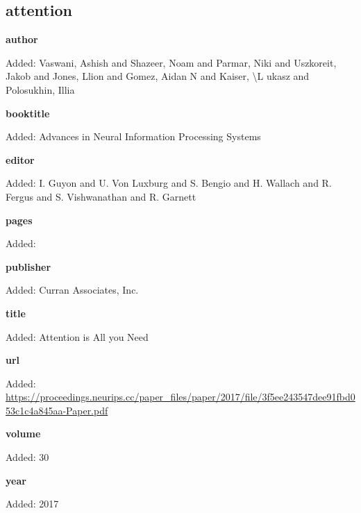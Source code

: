 \subsection*{attention}
\noindent{}\par
\noindent\textbf{author}\par
{\color{AuditGreen}Added: Vaswani, Ashish and Shazeer, Noam and Parmar, Niki and Uszkoreit, Jakob and Jones, Llion and Gomez, Aidan N and Kaiser, \textbackslash{}L ukasz and Polosukhin, Illia\par}
\noindent\textbf{booktitle}\par
{\color{AuditGreen}Added: Advances in Neural Information Processing Systems\par}
\noindent\textbf{editor}\par
{\color{AuditGreen}Added: I. Guyon and U. Von Luxburg and S. Bengio and H. Wallach and R. Fergus and S. Vishwanathan and R. Garnett\par}
\noindent\textbf{pages}\par
{\color{AuditGreen}Added: \par}
\noindent\textbf{publisher}\par
{\color{AuditGreen}Added: Curran Associates, Inc.\par}
\noindent\textbf{title}\par
{\color{AuditGreen}Added: Attention is All you Need\par}
\noindent\textbf{url}\par
{\color{AuditGreen}Added: \url{https://proceedings.neurips.cc/paper_files/paper/2017/file/3f5ee243547dee91fbd053c1c4a845aa-Paper.pdf}\par}
\noindent\textbf{volume}\par
{\color{AuditGreen}Added: 30\par}
\noindent\textbf{year}\par
{\color{AuditGreen}Added: 2017\par}
\medskip

